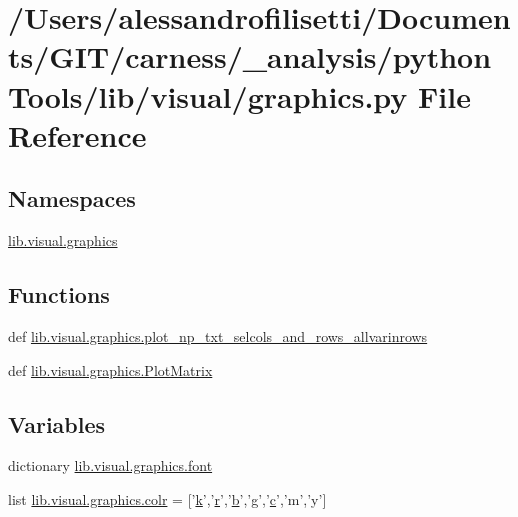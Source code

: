 \hypertarget{a00097}{\section{/\+Users/alessandrofilisetti/\+Documents/\+G\+I\+T/carness/\+\_\+analysis/python\+Tools/lib/visual/graphics.py File Reference}
\label{a00097}
}
\subsection*{Namespaces}
\begin{DoxyCompactItemize}
\item 
 \hyperlink{a00152}{lib.\+visual.\+graphics}
\end{DoxyCompactItemize}
\subsection*{Functions}
\begin{DoxyCompactItemize}
\item 
def \hyperlink{a00152_aa27c34e948992165c7a98e5ca3605549}{lib.\+visual.\+graphics.\+plot\+\_\+np\+\_\+txt\+\_\+selcols\+\_\+and\+\_\+rows\+\_\+allvarinrows}
\item 
def \hyperlink{a00152_a99e047c066345a973bfbb527e8a91085}{lib.\+visual.\+graphics.\+Plot\+Matrix}
\end{DoxyCompactItemize}
\subsection*{Variables}
\begin{DoxyCompactItemize}
\item 
dictionary \hyperlink{a00152_a3c83ccb4d4d1fcb0ea5f6b8616a1d0df}{lib.\+visual.\+graphics.\+font}
\item 
list \hyperlink{a00152_aae94b6a9df961a260c0fa476e2b4693a}{lib.\+visual.\+graphics.\+colr} = \mbox{[}'\hyperlink{a00110_abf70355c2e58f64c6b18bda1b9bccfd7}{k}','\hyperlink{a00031_ac862e7284527eb913b1351c8bfb8e079}{r}','\hyperlink{a00035_a50b4f3ddde10830a3976c71083aaee3f}{b}','g','\hyperlink{a00035_a6be92348ba85ef257b11d06209e1d7b6}{c}','m','y'\mbox{]}
\end{DoxyCompactItemize}
